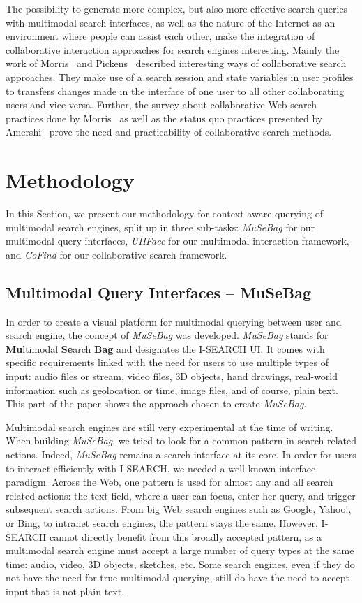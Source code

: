\documentclass[runningheads,a4paper]{llncs} \usepackage[utf8]{inputenc}
\begin{document}
The possibility to generate more complex, but also more effective search queries with multimodal search interfaces, as well as the nature of the Internet as an environment where people can assist each other, make the integration of
collaborative interaction approaches for search engines interesting. Mainly the work of Morris~\cite{morris2007} and Pickens~\cite{pickens2008} described interesting ways of collaborative search approaches. They make use of a search
session and state variables in user profiles to transfers changes made in the interface of one user to all other collaborating users and vice versa. Further, the survey about collaborative Web search practices done by Morris~\cite{morris2008} as well as the status quo practices presented by Amershi~\cite{amershi2009} prove the need and practicability of collaborative search methods.

\section{Methodology}
In this Section, we present our methodology for context-aware querying of multimodal search engines, split up in three sub-tasks: \emph{MuSeBag} for our multimodal query interfaces, \emph{UIIFace} for our multimodal interaction framework, and \emph{CoFind} for our collaborative search framework.

\subsection{Multimodal Query Interfaces -- MuSeBag}
In order to create a visual platform for multimodal querying between user and search engine, the concept of \emph{MuSeBag} was developed. \emph{MuSeBag} stands for \textbf{Mu}ltimodal \textbf{Se}arch \textbf{Bag} and designates the \mbox{I-SEARCH} UI. It comes with specific requirements linked with the need for users to use multiple types of input: audio files or stream, video files, 3D objects, hand drawings, real-world information such as geolocation or time, image files, and of course, plain text. This part of the paper shows the approach chosen to create \emph{MuSeBag}.

Multimodal search engines are still very experimental at the time of writing. When building \emph{MuSeBag}, we tried to look for a common pattern in search-related actions. Indeed, \emph{MuSeBag} remains a search interface at its core. In order for users to interact efficiently with \mbox{I-SEARCH}, we needed a well-known interface paradigm. Across the Web, one pattern is used for almost any and all search related actions: the text field, where a user can focus, enter her query, and trigger subsequent search actions. From big Web search engines such as Google, Yahoo!, or Bing, to intranet search engines, the pattern stays the same. However, \mbox{I-SEARCH} cannot directly benefit from this broadly accepted pattern, as a multimodal search engine must accept a large number of query types at the same time: audio, video, 3D objects, sketches, etc. Some search engines, even if they do not have the need for true multimodal querying, still do have the need to accept input that is not plain text.
\end{document}
